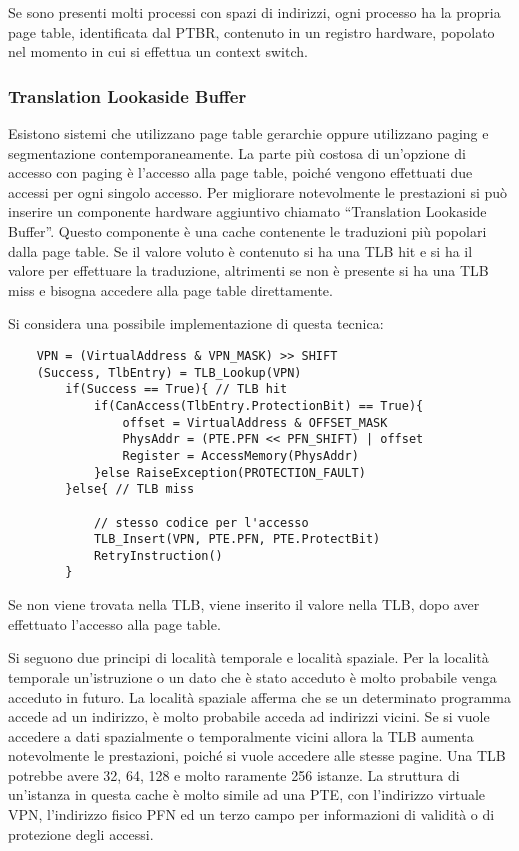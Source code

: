\documentclass{article}
\numberwithin{equation}{subsection}
\begin{document}
Se sono presenti molti processi con spazi di indirizzi, ogni processo ha la propria page table, identificata dal PTBR, contenuto in un registro hardware, popolato nel 
momento in cui si effettua un context switch. 

\subsubsection{Translation Lookaside Buffer}

Esistono sistemi che utilizzano page table gerarchie oppure utilizzano paging e segmentazione contemporaneamente. 
La parte più costosa di un'opzione di accesso con paging è l'accesso alla page table, poiché vengono effettuati due accessi per ogni singolo accesso. 
Per migliorare notevolmente le prestazioni si può 
inserire un componente hardware aggiuntivo chiamato ``Translation Lookaside Buffer''. Questo componente è una cache contenente le traduzioni più popolari 
dalla page table. Se il valore voluto è contenuto si ha una TLB hit e si ha il valore per effettuare la traduzione, altrimenti se non è presente si ha una TLB miss 
e bisogna accedere alla page table direttamente. 


Si considera una possibile implementazione di questa tecnica: 

\begin{verbatim}
    VPN = (VirtualAddress & VPN_MASK) >> SHIFT
    (Success, TlbEntry) = TLB_Lookup(VPN)
        if(Success == True){ // TLB hit
            if(CanAccess(TlbEntry.ProtectionBit) == True){
                offset = VirtualAddress & OFFSET_MASK
                PhysAddr = (PTE.PFN << PFN_SHIFT) | offset
                Register = AccessMemory(PhysAddr)
            }else RaiseException(PROTECTION_FAULT)
        }else{ // TLB miss
            
            // stesso codice per l'accesso          
            TLB_Insert(VPN, PTE.PFN, PTE.ProtectBit)
            RetryInstruction()
        }   
\end{verbatim}

Se non viene trovata nella TLB, viene inserito il valore nella TLB, dopo aver effettuato l'accesso alla page table. 

Si seguono due principi di località temporale e località spaziale. Per la località temporale un'istruzione o un dato che è stato acceduto è molto probabile venga 
acceduto in futuro. La località spaziale afferma che se un determinato programma accede ad un indirizzo, è molto probabile acceda ad indirizzi vicini. 
Se si vuole accedere a dati spazialmente o temporalmente vicini allora la TLB aumenta notevolmente le prestazioni, poiché si vuole accedere alle stesse pagine.  
Una TLB potrebbe avere 32, 64, 128 e molto raramente 256 istanze. 
La struttura di un'istanza in questa cache è molto simile ad una PTE, con l'indirizzo virtuale VPN, l'indirizzo fisico PFN ed un terzo campo per informazioni di validità o 
di protezione degli accessi. 
\end{document}
